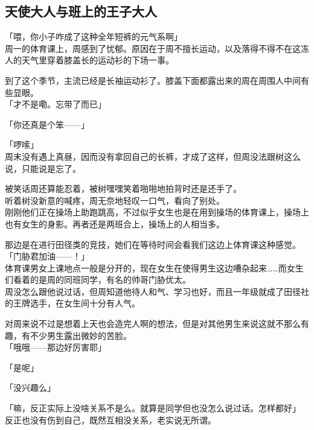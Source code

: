 \subsection{天使大人与班上的王子大人}

「喂，你小子咋成了这种全年短裤的元气系啊」\\

周一的体育课上，周感到了忧郁。原因在于周不擅长运动，以及落得不得不在这冻人的天气里穿着膝盖长的运动衫的下场一事。

到了这个季节，主流已经是长袖运动衫了。膝盖下面都露出来的周在周围人中间有些显眼。\\

「才不是嘞。忘带了而已」

「你还真是个笨——」

「啰嗦」\\

周末没有遇上真昼，因而没有拿回自己的长裤，才成了这样，但周没法跟树这么说，只能说是忘了。

被笑话周还算能忍着，被树嘿嘿笑着啪啪地拍背时还是还手了。\\

听着树没新意的喊疼，周无奈地轻叹一口气，看向了别处。\\

刚刚他们正在操场上助跑跳高，不过似乎女生也是在用到操场的体育课上，操场上也有女生的身影。再者还是两班合上，操场上的人相当多。

那边是在进行田径类的竞技，她们在等待时间会看我们这边上体育课这种感觉。\\

「门胁君加油——！」\\

体育课男女上课地点一般是分开的，现在女生在使得男生这边嘈杂起来……而女生们看着的是周的同班同学，有名的帅哥门胁优太。\\

周没怎么跟他说过话，但周知道他待人和气、学习也好，而且一年级就成了田径社的王牌选手，在女生间十分有人气。

对周来说不过是想着上天也会造完人啊的想法，但是对其他男生来说这就不那么有趣，有不少男生露出微妙的苦脸。\\

「哦哦——那边好厉害耶」

「是呢」

「没兴趣么」

「嘛，反正实际上没啥关系不是么。就算是同学但也没怎么说过话。怎样都好」\\

反正也没有伤到自己，既然互相没关系，老实说无所谓。\\

